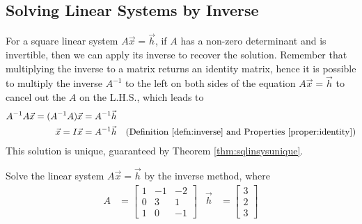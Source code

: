 \subsection{Solving Linear Systems by Inverse}
\label{subsection:SolLinSysInv}
For a square linear system $A\vec{x} = \vec{h}$, if $A$ has a non-zero determinant and is invertible, then we can apply its inverse to recover the solution. Remember that multiplying the inverse to a matrix returns an identity matrix, hence it is possible to multiply the inverse $A^{-1}$ to the left on both sides of the equation $A\vec{x} = \vec{h}$ to cancel out the $A$ on the L.H.S., which leads to
\begin{align*}
A^{-1}A\vec{x}= (A^{-1}A)\vec{x} &= A^{-1}\vec{h} \\
\vec{x} = I\vec{x} &= A^{-1}\vec{h} &\text{(Definition \ref{defn:inverse} and Properties \ref{proper:identity})}
\end{align*}
This solution is unique, guaranteed by Theorem \ref{thm:sqlinsysunique}.
\begin{exmp}
Solve the linear system $A\vec{x} = \vec{h}$ by the inverse method, where
\begin{align*}
A &=
\begin{bmatrix}
1 & -1 & -2 \\
0 & 3 & 1 \\
1 & 0 & -1
\end{bmatrix}
& \vec{h} &=
\begin{bmatrix}
3 \\
2 \\
3
\end{bmatrix}
\end{align*}
\end{exmp}

